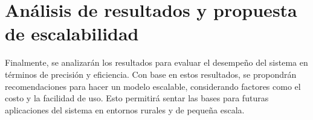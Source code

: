 \section{Análisis de resultados y propuesta  de escalabilidad}

Finalmente, se analizarán los resultados para evaluar el desempeño del sistema en términos de precisión y eficiencia. Con base en estos resultados, se propondrán recomendaciones para hacer un modelo escalable, considerando factores como el costo y la facilidad de uso. Esto permitirá sentar las bases para futuras aplicaciones del sistema en entornos rurales y de pequeña escala.
